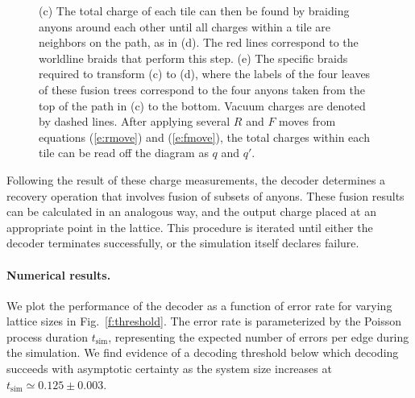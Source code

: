 \documentclass[aps, prl, letterpaper, twocolumn, superscriptaddress, notitlepage, 10pt]{revtex4-1}
\newcommand{\Fref}[1]{Fig.~\ref{#1}}
\begin{document}
\begin{figure}[t!]
\begin{center}
{(c) The total charge of each tile can then be found by braiding anyons around each other until all charges within a tile are neighbors on the path, as in (d). 
The red lines correspond to the worldline braids that perform this step.
(e) The specific braids required to transform (c) to (d), where the labels of the four leaves of these fusion trees correspond to the four anyons taken from the top of the path in (c) to the bottom. 
Vacuum charges are denoted by dashed lines. 
After applying several $R$ and $F$ moves from equations (\ref{e:rmove}) and (\ref{e:fmove}), the total charges within each tile can be read off the diagram as $q$ and $q'$.}
\label{f:syndrome}
\end{center}
\end{figure}

Following the result of these charge measurements, the decoder determines a recovery operation that involves fusion of subsets of anyons. 
These fusion results can be calculated in an analogous way, and the output charge placed at an appropriate point in the lattice. 
This procedure is iterated until either the decoder terminates successfully, or the simulation itself declares failure.


\paragraph{Numerical results.}

We plot the performance of the decoder as a function of error rate for varying lattice sizes in 
\Fref{f:threshold}. 
The error rate is parameterized by the Poisson process duration $t_{\mathrm{sim}}$, representing the expected number of errors per edge during the simulation. 
We find evidence of a decoding threshold below which decoding succeeds with asymptotic 
certainty as the system size increases at $t_{\mathrm{sim}}\simeq 0.125 \pm 0.003$.
\end{document}
